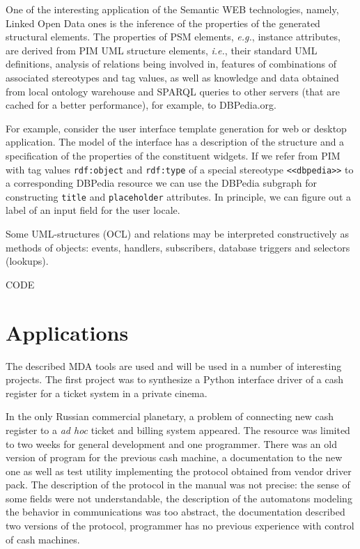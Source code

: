 \documentclass[conference,a4paper]{IEEEtran}
\begin{document}
One of the interesting application of the Semantic WEB technologies, namely, Linked Open Data ones is the inference of the properties of the generated structural elements.  The properties of PSM elements, \emph{e.g.}, instance attributes, are derived from PIM UML structure elements, \emph{i.e.}, their standard UML definitions, analysis of relations being involved in, features of combinations of associated stereotypes and tag values, as well as knowledge and data obtained from local ontology warehouse and SPARQL queries to other servers (that are cached for a better performance), for example, to DBPedia.org.

For example, consider the user interface template generation for web or desktop application.  The model of the interface has a description of the structure and a specification of the properties of the constituent widgets.  If we refer from PIM with tag values \texttt{rdf:object} and \texttt{rdf:type} of a special stereotype \texttt{<<dbpedia>>} to a corresponding DBPedia resource we can use the DBPedia subgraph for constructing \texttt{title} and \texttt{placeholder} attributes.  In principle, we can figure out a label of an input field for the user locale.


Some UML-structures (OCL) and relations may be interpreted constructively as methods of objects: events, handlers, subscribers, database triggers and selectors (lookups).


CODE

\section{Applications}
\label{sec:app}

The described MDA tools are used and will be used in a number of interesting projects.  The first project was to synthesize a Python interface driver of a cash register for a ticket system in a private cinema.

In the only Russian commercial planetary, a problem of connecting new cash register to a \emph{ad hoc} ticket and billing system appeared.  The resource was limited to two weeks for general development and one programmer.  There was an old version of program for the previous cash machine, a documentation to the new one as well as test utility implementing the protocol obtained from vendor driver pack.  The description of the protocol in the manual was not precise: the sense of some fields were not understandable, the description of the automatons modeling the behavior in communications was too abstract, the documentation described two versions of the protocol, programmer has no previous experience with control of cash machines.
\end{document}
